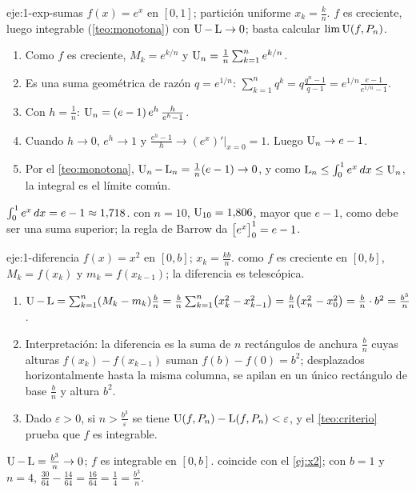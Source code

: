 \begin{solucion}{eje:1-exp-sumas}
\datos $f(x)=e^{x}$ en $[0,1]$; partición uniforme $x_k=\frac kn$.
\planteamiento $f$ es creciente, luego integrable (\cref{teo:monotona}) con $\operatorname{U}-\operatorname{L}\to0$; basta calcular $\lim\operatorname{U}(f,P_n)$.
\pasos
\begin{enumerate}[label=\arabic*.]
  \item Como $f$ es creciente, $M_k=e^{k/n}$ y $\operatorname{U}_n=\frac1n\sum_{k=1}^{n}e^{k/n}$.
  \item Es una suma geométrica de razón $q=e^{1/n}$: $\sum_{k=1}^{n}q^{k}=q\frac{q^{n}-1}{q-1}=e^{1/n}\frac{e-1}{e^{1/n}-1}$.
  \item Con $h=\frac1n$: $\operatorname{U}_n=(e-1)\,e^{h}\,\frac{h}{e^{h}-1}$.
  \item Cuando $h\to0$, $e^{h}\to1$ y $\frac{e^{h}-1}{h}\to(e^{x})'\big|_{x=0}=1$. Luego $\operatorname{U}_n\to e-1$.
  \item Por el \cref{teo:monotona}, $\operatorname{U}_n-\operatorname{L}_n=\frac1n(e-1)\to0$, y como $\operatorname{L}_n\le\int_0^1e^x\mathop{}\!d x\le\operatorname{U}_n$, la integral es el límite común.
\end{enumerate}
\resultado $\int_0^{1}e^{x}\mathop{}\!d x=e-1\approx1{,}718$.
\comprobacion con $n=10$, $\operatorname{U}_{10}=1{,}806$, mayor que $e-1$, como debe ser una suma superior; la regla de Barrow da $\bigl[e^{x}\bigr]_{0}^{1}=e-1$.
\end{solucion}

\begin{solucion}{eje:1-diferencia}
\datos $f(x)=x^{2}$ en $[0,b]$; $x_k=\frac{kb}{n}$.
\planteamiento como $f$ es creciente en $[0,b]$, $M_k=f(x_k)$ y $m_k=f(x_{k-1})$; la diferencia es telescópica.
\pasos
\begin{enumerate}[label=\arabic*.]
  \item $\operatorname{U}-\operatorname{L}=\sum_{k=1}^{n}(M_k-m_k)\frac bn=\frac bn\sum_{k=1}^{n}\bigl(x_k^{2}-x_{k-1}^{2}\bigr)=\frac bn\bigl(x_n^{2}-x_0^{2}\bigr)=\frac bn\cdot b^{2}=\frac{b^{3}}{n}$.
  \item Interpretación: la diferencia es la suma de $n$ rectángulos de anchura $\frac bn$ cuyas alturas $f(x_k)-f(x_{k-1})$ suman $f(b)-f(0)=b^{2}$; desplazados horizontalmente hasta la misma columna, se apilan en un único rectángulo de base $\frac bn$ y altura $b^{2}$.
  \item Dado $\varepsilon>0$, si $n>\frac{b^{3}}{\varepsilon}$ se tiene $\operatorname{U}(f,P_n)-\operatorname{L}(f,P_n)<\varepsilon$, y el \cref{teo:criterio} prueba que $f$ es integrable.
\end{enumerate}
\resultado $\operatorname{U}-\operatorname{L}=\frac{b^{3}}{n}\to0$; $f$ es integrable en $[0,b]$.
\comprobacion coincide con el \cref{ej:x2}; con $b=1$ y $n=4$, $\frac{30}{64}-\frac{14}{64}=\frac{16}{64}=\frac14=\frac{b^{3}}{n}$.
\end{solucion}

